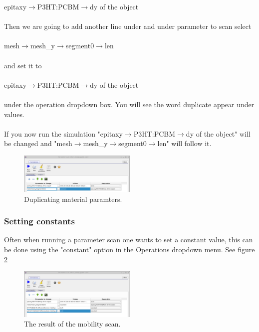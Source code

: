 epitaxy$\rightarrow$P3HT:PCBM$\rightarrow$dy of the object
\\
\\
Then we are going to add another line under and under parameter to scan select
\\
\\
mesh$\rightarrow$mesh\_y$\rightarrow$segment0$\rightarrow$len
\\
\\
and set it to
\\
\\
epitaxy$\rightarrow$P3HT:PCBM$\rightarrow$dy of the object
\\
\\
under the operation dropdown box. You will see the word duplicate appear under values.
\\
\\
If you now run the simulation "epitaxy$\rightarrow$P3HT:PCBM$\rightarrow$dy of the object" will be changed and "mesh$\rightarrow$mesh\_y$\rightarrow$segment0$\rightarrow$len" will follow it.


\begin{figure}[H]
\centering
\includegraphics[width=0.5\textwidth]{./images/param_scan_duplicate.png}
\caption{Duplicating material paramters.}
\label{fig:scanduplicate}
\end{figure}

\subsubsection{Setting constants}
Often when running a parameter scan one wants to set a constant value, this can be done using the "constant" option in the Operations dropdown menu. See figure \ref{fig:scanconst}

\begin{figure}[H]
\centering
\includegraphics[width=0.5\textwidth]{./images/param_scan_const.png}
\caption{The result of the mobility scan.}
\label{fig:scanconst}
\end{figure}



